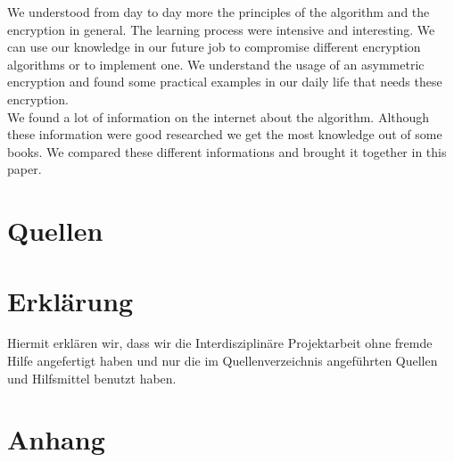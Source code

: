 We understood from day to day more the principles of the algorithm and the encryption in general. The learning process were intensive and interesting. We can use our knowledge in our future job to compromise different encryption algorithms or to implement one. We understand the usage of an asymmetric encryption and found some practical examples in our daily life that needs these encryption.\\ 
We found a lot of information on the internet about the algorithm. Although these information were good researched we get the most knowledge out of some books. We compared these different informations and brought it together in this paper.

\section{Quellen}
\listoffigures
\section{Erklärung}
Hiermit erklären wir, dass wir die Interdisziplinäre Projektarbeit ohne fremde Hilfe angefertigt haben und nur die im Quellenverzeichnis angeführten Quellen und Hilfsmittel benutzt haben.
\section{Anhang}
